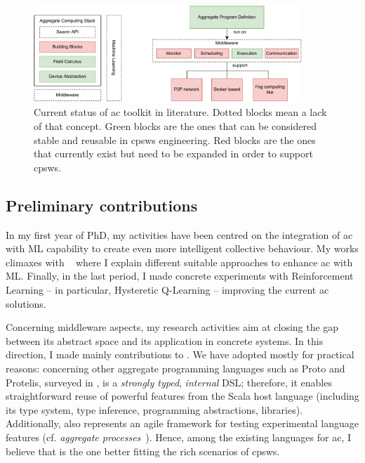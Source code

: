 \documentclass[11pt]{article}
\begin{document}
\begin{figure}[t]
	\centering
	\includegraphics[width=0.9\textwidth]{img/to-do-for-thesis.pdf}
	\caption{Current status of \ac{ac} toolkit in literature. Dotted blocks mean a lack of that concept. Green blocks are the ones that can be considered stable and reusable in \acp{cpsw} engineering. Red blocks are the ones that currently exist but need to be expanded in order to support \acp{cpsw}.}
	\label{fig:current-state}
\end{figure}
\subsection{Preliminary contributions}
In my first year of PhD, my activities have been centred on
the integration of \ac{ac} with ML capability to create even more
intelligent collective behaviour. 
%
My works climaxes with ~\cite{research} where I explain different suitable approaches to
enhance \ac{ac} with ML. Finally, in the last period, I made concrete
experiments with Reinforcement Learning -- in particular, Hysteretic Q-Learning \cite{hysteretic-q} -- improving the current \ac{ac} solutions.

Concerning middleware aspects, my research activities aim at closing the gap between
its abstract space and its application in concrete systems. In this direction, I made mainly contributions to \scafi{}.
%
We have adopted \scafi{} mostly for practical reasons: concerning other aggregate programming languages such as Proto and Protelis, surveyed in \cite{viroli2019jlamp-si-coord},
\scafi{} is a \emph{strongly typed}, \emph{internal} DSL; therefore, it enables straightforward reuse of powerful features from the Scala host language (including its type system, type inference, programming abstractions, libraries).
%
Additionally, \scafi{} also represents an agile framework for testing experimental language features (cf. \emph{aggregate processes}~\cite{DBLP:journals/eaai/CasadeiVAPD21}).
%
Hence, among the existing languages for \ac{ac}, I believe that \scafi{} is the one better fitting the rich scenarios of \acp{cpsw}.
\end{document}
